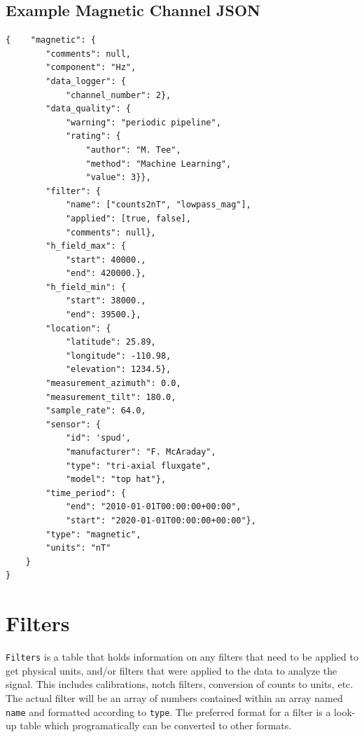\documentclass[12pt]{article}
\begin{document}
\clearpage
\newpage



\subsection{Example Magnetic Channel JSON}

\begin{verbatim}
{    "magnetic": {
        "comments": null,
        "component": "Hz",
        "data_logger": {
            "channel_number": 2},
        "data_quality": {
            "warning": "periodic pipeline",
            "rating": {
                "author": "M. Tee",
                "method": "Machine Learning",
                "value": 3}},
        "filter": {
            "name": ["counts2nT", "lowpass_mag"],
            "applied": [true, false],
            "comments": null},
        "h_field_max": {
            "start": 40000.,
            "end": 420000.},
        "h_field_min": {
            "start": 38000.,
            "end": 39500.},
        "location": {
            "latitude": 25.89,
            "longitude": -110.98,
            "elevation": 1234.5},
        "measurement_azimuth": 0.0,
        "measurement_tilt": 180.0,
        "sample_rate": 64.0,
        "sensor": {
            "id": 'spud',
            "manufacturer": "F. McAraday",
            "type": "tri-axial fluxgate",
            "model": "top hat"},
        "time_period": {
            "end": "2010-01-01T00:00:00+00:00",
            "start": "2020-01-01T00:00:00+00:00"},
        "type": "magnetic",
        "units": "nT"
    }
}
\end{verbatim}

\newpage
\section{Filters}

\verb|Filters| is a table that holds information on any filters that need to be applied to get physical units, and/or filters that were applied to the data to analyze the signal.  This includes calibrations, notch filters, conversion of counts to units, etc. The actual filter will be an array of numbers contained within an array named \verb|name| and formatted according to \verb|type|. The preferred format for a filter is a look-up table which programatically can be converted to other formats. 
\end{document}
